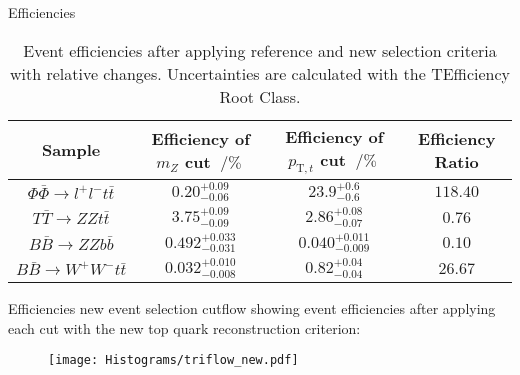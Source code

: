 \documentclass[aspectratio=1610, professionalfonts, 9pt]{beamer}
\begin{document}
\begin{frame}{Efficiencies}
  \begin{table}
      \caption{Event efficiencies after applying reference and new selection criteria with relative changes. Uncertainties are calculated with the TEfficiency Root Class.}
      \label{tab:final}
      \begin{tabular}{cccc}
          \toprule
          Sample & Efficiency of \(m_{Z}\) cut \(\mathrel{/}\si{\percent}\) & Efficiency of \(p_{\mathrm{T},t}\) cut \(\mathrel{/}\si{\percent}\) & Efficiency Ratio \\
          \midrule
          \(\Phi \bar{\Phi} \rightarrow l^+l^-t\bar{t}\)& \(0.20^{+0.09}_{-0.06}\) & \(23.9^{+0.6}_{-0.6}\) & \(118.40\)\\
          \(T\bar{T}\rightarrow ZZt\bar{t}\)& \(3.75^{+0.09}_{-0.09}\) & \(2.86^{+0.08}_{-0.07}\) & \(0.76\)\\
          \(B\bar{B}\rightarrow ZZb\bar{b}\)& \(0.492^{+0.033}_{-0.031}\) & \(0.040^{+0.011}_{-0.009}\) & \(0.10\)\\
          \(B\bar{B}\rightarrow W^+W^-t\bar{t}\)&  \(0.032^{+0.010}_{-0.008}\) & \(0.82^{+0.04}_{-0.04}\) & \(26.67\)\\
          \bottomrule
      \end{tabular}
  \end{table}
\end{frame}

\begin{frame}{Efficiencies}
  new event selection cutflow showing event efficiencies after applying each cut with the new top quark reconstruction criterion:
  \begin{figure}
    \centering
    \texttt{[image: Histograms/triflow\_new.pdf]}
    \label{fig:newtriflow}
  \end{figure}
\end{frame}
\end{document}
